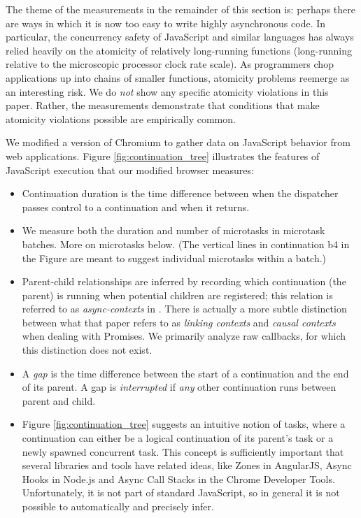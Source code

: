\documentclass[acmsmall,anonymous,review]{acmart}\settopmatter{printfolios=true,printccs=false,printacmref=false}
\begin{document}
The theme of the measurements in the remainder of this section is: perhaps there are ways in which it is now too easy to write highly asynchronous code.
In particular, the concurrency safety of JavaScript and similar languages has always relied heavily on the atomicity of relatively long-running functions (long-running relative to the microscopic processor clock rate scale).
As programmers chop applications up into chains of smaller functions, atomicity problems reemerge as an interesting risk.
We do \emph{not} show any specific atomicity violations in this paper.
Rather, the measurements demonstrate that conditions that make atomicity violations possible are empirically common.

We modified a version of Chromium to gather data on JavaScript behavior from web applications.
Figure \ref{fig:continuation_tree} illustrates the features of JavaScript execution that our modified browser measures:

\begin{itemize}
\item Continuation duration is the time difference between when the dispatcher passes control to a continuation and when it returns.
\item We measure both the duration and number of microtasks in microtask batches.
  More on microtasks below.
  (The vertical lines in continuation \textsf{b4} in the Figure are meant to suggest individual microtasks within a batch.)
\item Parent-child relationships are inferred by recording which continuation (the parent) is running when potential children are registered; this relation is referred to as \emph{async-contexts} in \cite{Loring2017}.
  There is actually a more subtle distinction between what that paper refers to as \emph{linking contexts} and \emph{causal contexts} when dealing with Promises.
  We primarily analyze raw callbacks, for which this distinction does not exist.
\item A \emph{gap} is the time difference between the start of a continuation and the end of its parent.
  A gap is \emph{interrupted} if \emph{any} other continuation runs between parent and child.
\item Figure \ref{fig:continuation_tree} suggests an intuitive notion of tasks, where a continuation can either be a logical continuation of its parent's task or a newly spawned concurrent task.
  This concept is sufficiently important that several libraries and tools have related ideas, like Zones in AngularJS, Async Hooks in Node.js and Async Call Stacks in the Chrome Developer Tools.
  Unfortunately, it is not part of standard JavaScript, so in general it is not possible to automatically and precisely infer.
\end{itemize}
\end{document}
